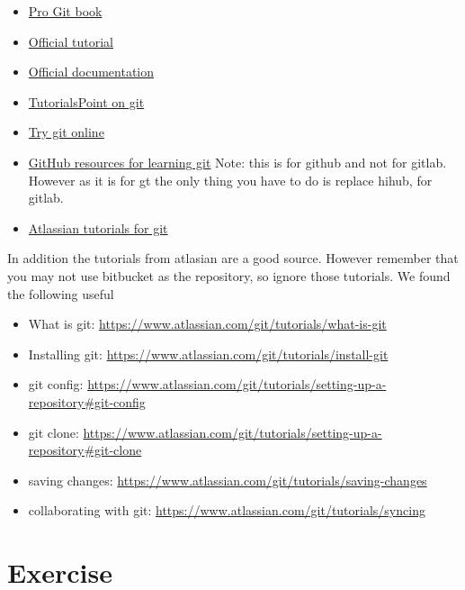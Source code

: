 \begin{itemize}
\item
  \href{https://git-scm.com/book/en/v2}{Pro Git book}
\item
  \href{https://git-scm.com/docs/gittutorial}{Official tutorial}
\item
  \href{https://git-scm.com/doc}{Official documentation}
\item
  \href{http://www.tutorialspoint.com/git/}{TutorialsPoint on git}
\item
  \href{https://try.github.io}{Try git online}
\item
  \href{https://help.github.com/articles/good-resources-for-learning-git-and-github/}{GitHub
  resources for learning git} Note: this is for github and not for
  gitlab. However as it is for gt the only thing you have to do is
  replace hihub, for gitlab.
\item
  \href{https://www.atlassian.com/git/tutorials/}{Atlassian tutorials
  for git}
\end{itemize}

In addition the tutorials from atlasian are a good source. However
remember that you may not use bitbucket as the repository, so ignore
those tutorials. We found the following useful

\begin{itemize}
\item
  What is git: \url{https://www.atlassian.com/git/tutorials/what-is-git}
\item
  Installing git:
  \url{https://www.atlassian.com/git/tutorials/install-git}
\item
  git config:
  \url{https://www.atlassian.com/git/tutorials/setting-up-a-repository\#git-config}
\item
  git clone:
  \url{https://www.atlassian.com/git/tutorials/setting-up-a-repository\#git-clone}
\item
  saving changes:
  \url{https://www.atlassian.com/git/tutorials/saving-changes}
\item
  collaborating with git:
  \url{https://www.atlassian.com/git/tutorials/syncing}
\end{itemize}


\section{Exercise}

